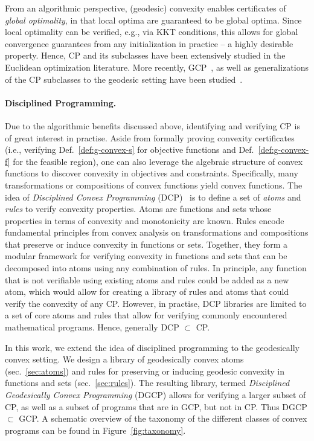 \documentclass[twoside,11pt]{article}
\begin{document}
From an algorithmic perspective, (geodesic) convexity enables certificates of \emph{global optimality}, in that local optima are guaranteed to be global optima. Since local optimality can be verified, e.g., via KKT conditions, this allows for  global convergence guarantees from any initialization in practice -- a highly desirable property. 
Hence, CP and its subclasses have been extensively studied in the Euclidean optimization literature. More recently, GCP~\citep{udriste1994convex,bacak2014convex,zhang2016riemannian,weber2022riemannian,weber2023global}, as well as generalizations of the CP subclasses to the geodesic setting have been studied~\citep{sra2015conic}.

\paragraph{Disciplined Programming.}
Due to the algorithmic benefits discussed above, identifying and verifying CP is of great interest in practise. Aside from formally proving convexity certificates (i.e., verifying Def.~\ref{def:g-convex-s} for objective functions and Def.~\ref{def:g-convex-f} for the feasible region), one can also leverage the algebraic structure of convex functions to discover convexity in objectives and constraints. Specifically, many transformations or compositions of convex functions yield convex functions. The idea of \emph{Disciplined Convex Programming} (DCP)~\citep{grant2006disciplined} is to define a set of \emph{atoms} and \emph{rules} to verify convexity properties. Atoms are functions and sets whose properties in terms of convexity and monotonicity are known. Rules encode fundamental principles from convex analysis on transformations and compositions that preserve or induce convexity in functions or sets. Together, they form a modular framework for verifying convexity in functions and sets that can be decomposed into atoms using any combination of rules. In principle, any function that is not verifiable using existing atoms and rules could be added as a new atom, which would allow for creating a library of rules and atoms that could verify the convexity of any CP. However, in practise, DCP libraries are limited to a set of core atoms and rules that allow for verifying commonly encountered mathematical programs. Hence, generally DCP $\subset$ CP.

In this work, we extend the idea of disciplined programming to the geodesically convex setting. We design a library of geodesically convex atoms (sec.~\ref{sec:atoms}) and rules for preserving or inducing geodesic convexity in functions and sets (sec.~\ref{sec:rules}). The resulting library, termed \emph{Disciplined Geodesically Convex Programming} (DGCP) allows for verifying a larger subset of CP, as well as a subset of programs that are in GCP, but not in CP. Thus DGCP $\subset$ GCP. A schematic overview of the taxonomy of the different classes of convex programs can be found in Figure~\ref{fig:taxonomy}.
\end{document}
